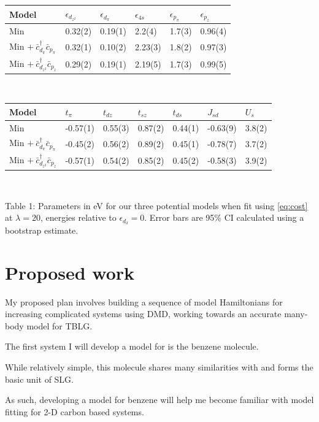 \documentclass[12pt]{article}
\begin{document}
\begin{table}[H]
\begin{center}
\begin{tabular}{l|lllll}
Model &$\epsilon_{d_{z^2}}$ & $\epsilon_{d_\pi}$ & $\epsilon_{4s}$ & $\epsilon_{p_\pi}$ & $\epsilon_{p_z}$ \\ \hline 
Min & 0.32(2)& 0.19(1)& 2.2(4)& 1.7(3)& 0.96(4)\\
Min $ +\ \bar{c}_{d_\pi}^\dagger \bar{c}_{p_\pi}$& 0.32(1)& 0.10(2)& 2.23(3)& 1.8(2)& 0.97(3)\\
Min $ +\ \bar{c}_{d_{z^2}}^\dagger \bar{c}_{p_z}$& 0.29(2)& 0.19(1)& 2.19(5)& 1.7(3)& 0.99(5)\\
\end{tabular} \\

\begin{tabular}{l|llllll}
Model &$t_\pi$ & $t_{dz}$ & $t_{sz}$ & $t_{ds}$ & $J_{sd}$ & $U_s$ \\ \hline 
Min &  -0.57(1)& 0.55(3)& 0.87(2)& 0.44(1)& -0.63(9)& 3.8(2)\\
Min $ +\ \bar{c}_{d_\pi}^\dagger \bar{c}_{p_\pi}$& -0.45(2)& 0.56(2)& 0.89(2)& 0.45(1)& -0.78(7)& 3.7(2)\\
Min $ +\ \bar{c}_{d_{z^2}}^\dagger \bar{c}_{p_z}$& -0.57(1)& 0.54(2)& 0.85(2)& 0.45(2)& -0.58(3)& 3.9(2)\\
\end{tabular} \\

\end{center}
Table 1: Parameters in eV for our three potential models when fit using \eqref{eq:cost} at $\lambda = 20$, energies relative to $\epsilon_{d_\delta} = 0$. Error bars are 95\% CI calculated using a bootstrap estimate.
\end{table}

\section{Proposed work}
My proposed plan involves building a sequence of model Hamiltonians for increasing complicated systems using DMD, working towards an accurate many-body model for TBLG.

The first system I will develop a model for is the benzene molecule.

While relatively simple, this molecule shares many similarities with and forms the basic unit of SLG.

As such, developing a model for benzene will help me become familiar with model fitting for 2-D carbon based systems.
\end{document}

